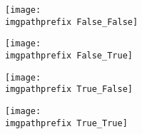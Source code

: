 \begin{figure}
    \centering
    \begin{subfigure}{0.45\textwidth}
        \centering
        \texttt{[image: \\imgpathprefix False\_False]}
        \caption{}
        \label{\imglabel -a}
    \end{subfigure}
    \hfill
    \begin{subfigure}{0.45\textwidth}
        \centering
        \texttt{[image: \\imgpathprefix False\_True]}
        \caption{}
        \label{\imglabel -b}
    \end{subfigure}

    \begin{subfigure}{0.45\textwidth}
        \centering
        \texttt{[image: \\imgpathprefix True\_False]}
        \caption{}
        \label{\imglabel -c}
    \end{subfigure}
    \hfill
    \begin{subfigure}{0.45\textwidth}
        \centering
        \texttt{[image: \\imgpathprefix True\_True]}
        \caption{}
        \label{\imglabel -d}
    \end{subfigure}
    \caption{\imgcaption}
    \label{\imglabel}
\end{figure}
